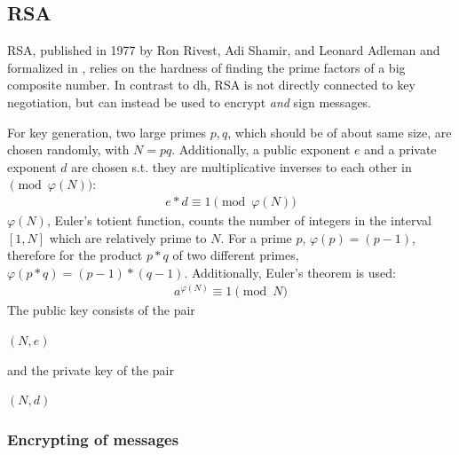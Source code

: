 \subsection{RSA}

RSA, published in 1977 by Ron Rivest, Adi Shamir, and Leonard Adleman \cite{RSA} and formalized in \cite{pkcs1},
relies on the hardness of finding the prime factors of a big composite number.
In contrast to \gls{dh}, RSA is not directly connected to key negotiation, but can instead be used to encrypt \textit{and} sign messages. 

For key generation, 
two large primes $p, q$, which should be of about same size, are chosen randomly, with $N = pq$. Additionally, a public exponent $e$ and a private exponent
$d$ are chosen s.t. they are multiplicative inverses to each other in $\pmod{\varphi(N)}$:
\begin{align}\label{ed}
 e * d \equiv 1 \pmod {\varphi(N)}
\end{align}
$\varphi(N)$, Euler's totient function, counts the number of integers in the interval $[1, N]$ which are relatively prime to $N$.
For a prime $p$, $\varphi(p) = (p-1)$, therefore for the product
$p*q$ of two different primes, $\varphi(p*q) = (p-1) * (q-1)$.
Additionally, Euler's theorem is used:
\begin{align}\label{euler}
a^{\varphi(N)} \equiv 1 \pmod N
\end{align}
The public key consists of the pair
\begin{center}
 $(N, e)$
\end{center}
and the private key of the pair
\begin{center}
 $(N, d)$
\end{center}

\subsubsection{Encrypting of messages}

